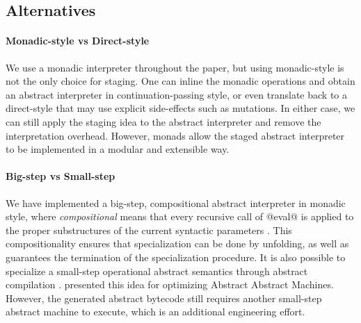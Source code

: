 \subsection{Alternatives}

\paragraph{Monadic-style vs Direct-style} We use a monadic interpreter
throughout the paper, but using monadic-style is not the only choice for
staging. One can inline the monadic operations and obtain an abstract
interpreter in continuation-passing style, or even translate back to a
direct-style that may use explicit side-effects such as mutations. In either
case, we can still apply the staging idea to the abstract interpreter and
remove the interpretation overhead.  However, monads allow the staged abstract
interpreter to be implemented in a modular and extensible way.

\paragraph{Big-step vs Small-step}

We have implemented a big-step, compositional abstract interpreter in monadic
style, where \textit{compositional} means that every recursive call of @eval@ %
is applied to the proper substructures of the current syntactic
parameters \cite{10.1007/3-540-61580-6_11}. This compositionality ensures that
specialization can be done by unfolding, as well as guarantees the termination
of the specialization procedure. It is also possible to specialize a small-step
operational abstract semantics through abstract compilation
\cite{Boucher:1996:ACN:647473.727587}.
\citet{Johnson:2013:OAA:2500365.2500604} presented this idea for optimizing
Abstract Abstract Machines. However, the generated abstract bytecode still
requires another small-step abstract machine to execute, which is an additional
engineering effort.
